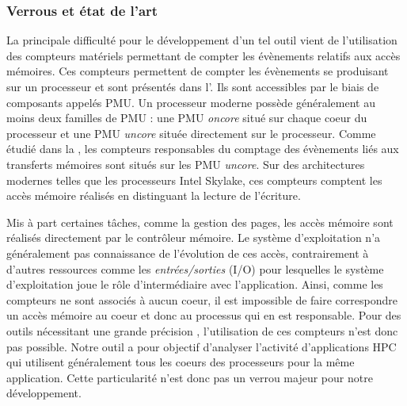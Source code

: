     \subsubsection{Verrous et état de l'art}
        
        La principale difficulté pour le développement d'un tel outil vient de l'utilisation des compteurs matériels permettant de compter les évènements relatifs aux accès mémoires. Ces compteurs permettent de compter les évènements se produisant sur un processeur et sont présentés dans l'. Ils sont accessibles par le biais de composants appelés \gls{PMU}. Un processeur moderne possède généralement au moins deux familles de PMU : une PMU \textit{oncore} situé sur chaque coeur du processeur et une PMU \textit{uncore} située directement sur le processeur. Comme étudié dans la , les compteurs  responsables du comptage des évènements liés aux transferts mémoires sont situés sur les PMU \textit{uncore}. Sur des architectures modernes telles que les processeurs Intel Skylake, ces compteurs comptent les accès mémoire réalisés en distinguant la lecture de l'écriture.
        
        Mis à part certaines tâches, comme la gestion des pages, les accès mémoire sont réalisés directement par le contrôleur mémoire. Le système d'exploitation n'a généralement pas connaissance de l'évolution de ces accès, contrairement à d'autres ressources comme les \textit{entrées/sorties} (I/O) pour lesquelles le système d'exploitation joue le rôle d'intermédiaire avec l'application. Ainsi, comme les compteurs ne sont associés à aucun coeur, il est impossible de faire correspondre un accès mémoire au coeur et donc au processus qui en est responsable. Pour des outils nécessitant une grande précision \cite{Larysch2016a}, l'utilisation de ces compteurs n'est donc pas possible. Notre outil a pour objectif d'analyser l'activité d'applications HPC qui utilisent généralement tous les coeurs des processeurs pour la même application. Cette particularité n'est donc pas un verrou majeur pour notre développement.  
 
